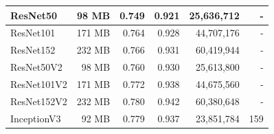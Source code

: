 \begin{table}[h!]
\begin{tabular}{|l|r|r|r|r|r|}
    ResNet50                                                     & 98 MB                              & 0.749                                                                                   & 0.921                                                                                   & 25,636,712                               & -                                   \\ \hline
    ResNet101                                                    & 171 MB                             & 0.764                                                                                   & 0.928                                                                                   & 44,707,176                               & -                                   \\ \hline
    ResNet152                                                    & 232 MB                             & 0.766                                                                                   & 0.931                                                                                   & 60,419,944                               & -                                   \\ \hline
    ResNet50V2                                                   & 98 MB                              & 0.760                                                                                   & 0.930                                                                                   & 25,613,800                               & -                                   \\ \hline
    ResNet101V2                                                  & 171 MB                             & 0.772                                                                                   & 0.938                                                                                   & 44,675,560                               & -                                   \\ \hline
    ResNet152V2                                                  & 232 MB                             & 0.780                                                                                   & 0.942                                                                                   & 60,380,648                               & -                                   \\ \hline
    InceptionV3                                                  & 92 MB                              & 0.779                                                                                   & 0.937                                                                                   & 23,851,784                               & 159                                 \\ \hline

\end{tabular}
\end{table}
